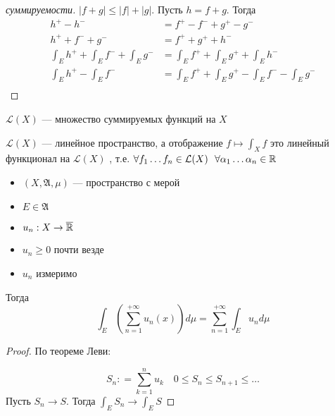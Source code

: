 \begin{proof}[суммируемости]
    \(|f + g| \leq |f| + |g|\). Пусть \(h = f + g\). Тогда
    \begin{align*}
        h^{ +} - h^{ -}                                & = f^{ +} - f^{ -} + g^{ +} - g^{ -}                               \\
        h^{ +} + f^{ -} + g^{ - }                      & = f^{ + } + g^{ +} + h^{ -}                                       \\
        \int_E h^{ +} + \int_E f^{ -} + \int_E g^{ - } & = \int_E f^{ +} + \int_E g^{ +} + \int_E h^{ - }                  \\
        \int_E h^{ +} - \int_E f^{ - }                 & = \int_E f^{ +} + \int_E g^{ +} - \int_E f^{ - } - \int_E g^{ - } \\
    \end{align*}
\end{proof}
\begin{definition}
    \(\mathcal{L}(X)\) --- множество суммируемых функций на \(X\)
\end{definition}
\begin{corollary}[следствия]
    \(\mathcal{L}(X)\) --- линейное пространство, а отображение \(f \mapsto \int_X f\) это линейный функционал на \(\mathcal{L}(X)\) %
    , т.е. \(\forall f_1 \dots f_n \in \mathcal{L}(X) \ \ \forall \alpha_1 \dots \alpha_n \in\mathbb{R}\)

    \? %
\end{corollary}

\begin{theorem}\itemfix
    \begin{itemize}
        \item \((X, \mathfrak{A}, \mu)\) --- пространство с мерой
        \item \(E\in \mathfrak{A}\)
        \item \(u_n : X \to \overline{\mathbb{R}}\)
        \item \(u_n \geq 0\) почти везде
        \item \(u_n\) измеримо
    \end{itemize}

    Тогда
    \[\int_E \left( \sum_{n = 1}^{+\infty} u_n(x) \right) d\mu = \sum_{n = 1}^{+\infty} \int_E u_n d\mu\]
\end{theorem}
\begin{proof}
    По теореме Леви:

    \[S_n : = \sum_{k = 1}^n u_k \quad 0 \leq S_n \leq S_{n+1} \leq \dots \]
    Пусть \(S_n \to S\). Тогда \(\int_E S_n \to \int_E S\)

\end{proof}

